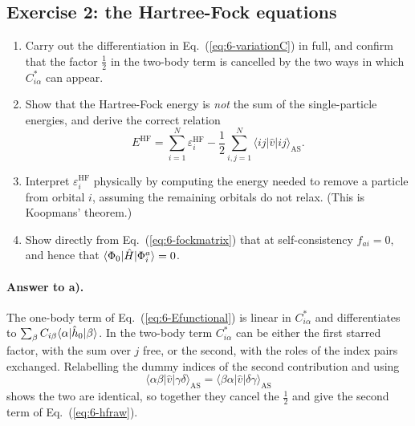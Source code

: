\subsection*{Exercise 2: the Hartree-Fock equations}
\label{ex:6-hfequations}

\begin{enumerate}
  \item[a)] Carry out the differentiation in Eq.~(\ref{eq:6-variationC})
  in full, and confirm that the factor $\tfrac12$ in the two-body term is
  cancelled by the two ways in which $C^{*}_{i\alpha}$ can appear.
  \item[b)] Show that the Hartree-Fock energy is \emph{not} the sum of the
  single-particle energies, and derive the correct relation
  \begin{equation*}
    E^{\mathrm{HF}} = \sum_{i=1}^{N}\varepsilon_i^{\mathrm{HF}}
      - \frac{1}{2}\sum_{i,j=1}^{N}
        \langle ij\vert\hat{v}\vert ij\rangle_{\mathrm{AS}} .
  \end{equation*}
  \item[c)] Interpret $\varepsilon_i^{\mathrm{HF}}$ physically by computing
  the energy needed to remove a particle from orbital $i$, assuming the
  remaining orbitals do not relax.  (This is Koopmans' theorem.)
  \item[d)] Show directly from Eq.~(\ref{eq:6-fockmatrix}) that at
  self-consistency $f_{ai}=0$, and hence that
  $\langle \Phi_0 | \hat{H} | \Phi_i^a \rangle=0$.
\end{enumerate}

\paragraph{Answer to a).}
The one-body term of Eq.~(\ref{eq:6-Efunctional}) is linear in
$C^{*}_{i\alpha}$ and differentiates to
$\sum_{\beta}C_{i\beta}\langle \alpha | \hat{h}_0 | \beta \rangle$.  In the two-body
term $C^{*}_{i\alpha}$ can be either the first starred factor, with the sum
over $j$ free, or the second, with the roles of the index pairs exchanged.
Relabelling the dummy indices of the second contribution and using
\begin{equation}
  \langle\alpha\beta\vert\hat{v}\vert\gamma\delta\rangle_{\mathrm{AS}}
  = \langle\beta\alpha\vert\hat{v}\vert\delta\gamma\rangle_{\mathrm{AS}}
  \label{eq:6-exa2}
\end{equation}
shows the two are identical, so together they cancel the $\tfrac12$ and give
the second term of Eq.~(\ref{eq:6-hfraw}).

